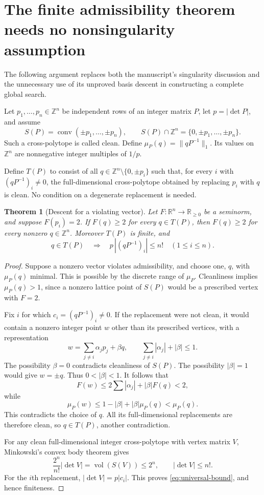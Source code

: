 \documentclass[11pt,reqno]{amsart}
\newtheorem{theorem}{Theorem}[section]
\theoremstyle{definition}
\newcommand{\R}{\mathbb R}
\newcommand{\Z}{\mathbb Z}
\newcommand{\norm}[1]{\lVert #1\rVert_1}
\newcommand{\vol}{\operatorname{vol}}
\newcommand{\conv}{\operatorname{conv}}
\begin{document}
\section{The finite admissibility theorem needs no nonsingularity assumption}\label{sec:finite}
The following argument replaces both the manuscript's singularity
discussion and the unnecessary use of its unproved basis descent in
constructing a complete global search.

Let $p_1,\ldots,p_n\in\Z^n$ be independent rows of an integer matrix
$P$, let $p=|\det P|$, and assume
\[
 S(P)=\conv(\pm p_1,\ldots,\pm p_n),\qquad
 S(P)\cap\Z^n=\{0,\pm p_1,\ldots,\pm p_n\}.
\]
Such a cross-polytope is called clean. Define
$\mu_P(q)=\norm{qP^{-1}}$. Its values on $\Z^n$ are nonnegative
integer multiples of $1/p$.

Define $T(P)$ to consist of all $q\in\Z^n\setminus\{0,\pm p_i\}$
such that, for every $i$ with $(qP^{-1})_i\ne0$, the full-dimensional
cross-polytope obtained by replacing $p_i$ with $q$ is clean.
No condition on a degenerate replacement is needed.

\begin{theorem}[Descent for a violating vector]\label{thm:finite}
Let $F:\R^n\to\R_{\ge0}$ be a seminorm, and suppose $F(p_i)=2$.
If $F(q)\ge2$ for every $q\in T(P)$, then $F(q)\ge2$ for every
nonzero $q\in\Z^n$. Moreover $T(P)$ is finite, and
\begin{equation}\label{eq:universal-bound}
 q\in T(P)\quad\Longrightarrow\quad
 p\,|(qP^{-1})_i|\le n!\quad(1\le i\le n).
\end{equation}
\end{theorem}
\begin{proof}
Suppose a nonzero vector violates admissibility, and choose one, $q$,
with $\mu_P(q)$ minimal. This is possible by the discrete range of
$\mu_P$. Cleanliness implies $\mu_P(q)>1$, since a nonzero lattice
point of $S(P)$ would be a prescribed vertex with $F=2$.

Fix $i$ for which $c_i=(qP^{-1})_i\ne0$. If the replacement were not
clean, it would contain a nonzero integer point $w$ other than its
prescribed vertices, with a representation
\[
 w=\sum_{j\ne i}\alpha_jp_j+\beta q,
 \qquad \sum_{j\ne i}|\alpha_j|+|\beta|\le1.
\]
The possibility $\beta=0$ contradicts cleanliness of $S(P)$. The
possibility $|\beta|=1$ would give $w=\pm q$. Thus $0<|\beta|<1$.
It follows that
\[
 F(w)\le2\sum|\alpha_j|+|\beta|F(q)<2,
\]
while
\[
 \mu_P(w)\le1-|\beta|+|\beta|\mu_P(q)<\mu_P(q).
\]
This contradicts the choice of $q$. All its full-dimensional replacements
are therefore clean, so $q\in T(P)$, another contradiction.

For any clean full-dimensional integer cross-polytope with vertex matrix
$V$, Minkowski's convex body theorem gives
\[
 \frac{2^n}{n!}|\det V|=\vol(S(V))\le2^n,
 \qquad |\det V|\le n!.
\]
For the $i$th replacement, $|\det V|=p|c_i|$. This proves
\eqref{eq:universal-bound}, and hence finiteness.
\end{proof}
\end{document}
